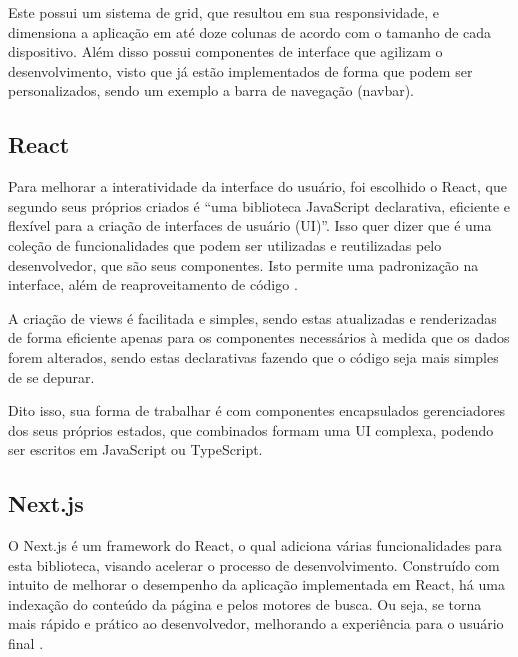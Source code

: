 Este possui um sistema de grid, que resultou em sua responsividade, e dimensiona a aplicação em até doze colunas de acordo com o tamanho de cada dispositivo. Além disso possui componentes de interface que agilizam o desenvolvimento, visto que já estão implementados de forma que podem ser personalizados, sendo um exemplo a barra de navegação (navbar).

\subsection{React}
Para melhorar a interatividade da interface do usuário, foi escolhido o React, que segundo seus próprios criados é “uma biblioteca JavaScript declarativa, eficiente e flexível para a criação de interfaces de usuário (UI)”. Isso quer dizer que é uma coleção de funcionalidades que podem ser utilizadas e reutilizadas pelo desenvolvedor, que são seus componentes. Isto permite uma padronização na interface, além de reaproveitamento de código \cite{ZAMMETTI}.

A criação de views é facilitada e simples, sendo estas atualizadas e renderizadas de forma eficiente apenas para os componentes necessários à medida que os dados forem alterados, sendo estas declarativas fazendo que o código seja mais simples de se depurar.

Dito isso, sua forma de trabalhar é com componentes encapsulados gerenciadores dos seus próprios estados, que combinados formam uma UI complexa, podendo ser escritos em JavaScript ou TypeScript.

\subsection{Next.js}
O Next.js é um framework do React, o qual adiciona várias funcionalidades para esta biblioteca, visando acelerar o processo de desenvolvimento. Construído com intuito de melhorar o desempenho da aplicação implementada em React, há uma indexação do conteúdo da página e pelos motores de busca. Ou seja, se torna mais rápido e prático ao desenvolvedor, melhorando a experiência para o usuário final \cite{KONSHIN}.

